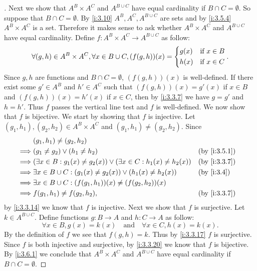 \begin{proof}[]
  Next we show that \(A^B \times A^C\) and \(A^{B \cup C}\) have equal cardinality if \(B \cap C = \emptyset\).
  So suppose that \(B \cap C = \emptyset\).
  By \cref{i:3.10} \(A^B, A^C, A^{B \cup C}\) are sets and by \cref{i:3.5.4} \(A^B \times A^C\) is a set.
  Therefore it makes sense to ask whether \(A^B \times A^C\) and \(A^{B \cup C}\) have equal cardinality.
  Define \(f : A^B \times A^C \to A^{B \cup C}\) as follow:
  \[
    \forall (g, h) \in A^B \times A^C, \forall x \in B \cup C, (f(g, h))(x) = \begin{dcases}
      g(x) & \text{if } x \in B \\
      h(x) & \text{if } x \in C
    \end{dcases}.
  \]
  Since \(g, h\) are functions and \(B \cap C = \emptyset\), \((f(g, h))(x)\) is well-defined.
  If there exist some \(g' \in A^B\) and \(h' \in A^C\) such that \((f(g, h))(x) = g'(x)\) if \(x \in B\) and \((f(g, h))(x) = h'(x)\) if \(x \in C\), then by \cref{i:3.3.7} we have \(g = g'\) and \(h = h'\).
  Thus \(f\) passes the vertical line test and \(f\) is well-defined.
  We now show that \(f\) is bijective.
  We start by showing that \(f\) is injective.
  Let \((g_1, h_1), (g_2, h_2) \in A^B \times A^C\) and \((g_1, h_1) \neq (g_2, h_2)\).
  Since
  \begin{align*}
             & (g_1, h_1) \neq (g_2, h_2)                                                                           \\
    \implies & (g_1 \neq g_2) \lor (h_1 \neq h_2)                                                 &  & \by{i:3.5.1} \\
    \implies & (\exists x \in B : g_1(x) \neq g_2(x)) \lor (\exists x \in C : h_1(x) \neq h_2(x)) &  & \by{i:3.3.7} \\
    \implies & \exists x \in B \cup C : (g_1(x) \neq g_2(x)) \lor (h_1(x) \neq h_2(x))            &  & \by{i:3.4}   \\
    \implies & \exists x \in B \cup C : (f(g_1, h_1))(x) \neq (f(g_2, h_2))(x)                                      \\
    \implies & f(g_1, h_1) \neq f(g_2, h_2),                                                      &  & \by{i:3.3.7}
  \end{align*}
  by \cref{i:3.3.14} we know that \(f\) is injective.
  Next we show that \(f\) is surjective.
  Let \(k \in A^{B \cup C}\).
  Define functions \(g : B \to A\) and \(h : C \to A\) as follow:
  \[
    \forall x \in B, g(x) = k(x) \quad \text{and} \quad \forall x \in C, h(x) = k(x).
  \]
  By the definition of \(f\) we see that \(f(g, h) = k\).
  Thus by \cref{i:3.3.17} \(f\) is surjective.
  Since \(f\) is both injective and surjective, by \cref{i:3.3.20} we know that \(f\) is bijective.
  By \cref{i:3.6.1} we conclude that \(A^B \times A^C\) and \(A^{B \cup C}\) have equal cardinality if \(B \cap C = \emptyset\).


\end{proof}
